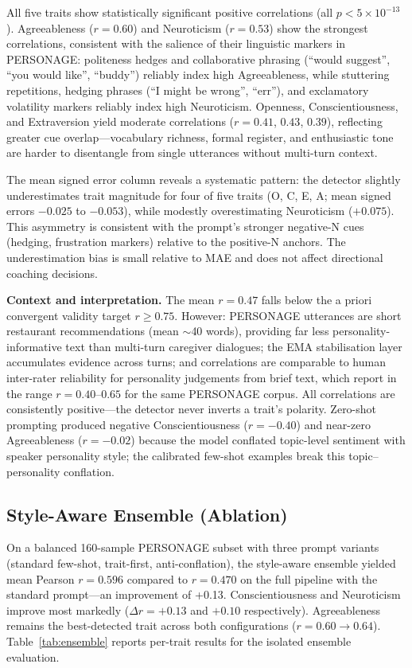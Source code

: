 \documentclass[10pt,a4paper]{report}
\begin{document}
All five traits show statistically significant positive correlations (all $p < 5 \times 10^{-13}$). Agreeableness ($r = 0.60$) and Neuroticism ($r = 0.53$) show the strongest correlations, consistent with the salience of their linguistic markers in PERSONAGE: politeness hedges and collaborative phrasing (``would suggest'', ``you would like'', ``buddy'') reliably index high Agreeableness, while stuttering repetitions, hedging phrases (``I might be wrong'', ``err''), and exclamatory volatility markers reliably index high Neuroticism. Openness, Conscientiousness, and Extraversion yield moderate correlations ($r = 0.41$, $0.43$, $0.39$), reflecting greater cue overlap---vocabulary richness, formal register, and enthusiastic tone are harder to disentangle from single utterances without multi-turn context.

The mean signed error column reveals a systematic pattern: the detector slightly underestimates trait magnitude for four of five traits (O, C, E, A; mean signed errors $-0.025$ to $-0.053$), while modestly overestimating Neuroticism ($+0.075$). This asymmetry is consistent with the prompt's stronger negative-N cues (hedging, frustration markers) relative to the positive-N anchors. The underestimation bias is small relative to MAE and does not affect directional coaching decisions.

\textbf{Context and interpretation.} The mean $r = 0.47$ falls below the a priori convergent validity target $r \geq 0.75$. However: PERSONAGE utterances are short restaurant recommendations (mean $\sim$40 words), providing far less personality-informative text than multi-turn caregiver dialogues; the EMA stabilisation layer accumulates evidence across turns; and correlations are comparable to human inter-rater reliability for personality judgements from brief text, which \citet{Mairesse2011} report in the range $r = 0.40$--$0.65$ for the same PERSONAGE corpus. All correlations are consistently positive---the detector never inverts a trait's polarity. Zero-shot prompting produced negative Conscientiousness ($r = -0.40$) and near-zero Agreeableness ($r = -0.02$) because the model conflated topic-level sentiment with speaker personality style; the calibrated few-shot examples break this topic--personality conflation.

\subsection{Style-Aware Ensemble (Ablation)}

On a balanced 160-sample PERSONAGE subset with three prompt variants (standard few-shot, trait-first, anti-conflation), the style-aware ensemble yielded mean Pearson $r = 0.596$ compared to $r = 0.470$ on the full pipeline with the standard prompt---an improvement of +0.13. Conscientiousness and Neuroticism improve most markedly ($\Delta r = +0.13$ and $+0.10$ respectively). Agreeableness remains the best-detected trait across both configurations ($r = 0.60 \to 0.64$). Table~\ref{tab:ensemble} reports per-trait results for the isolated ensemble evaluation.
\end{document}
